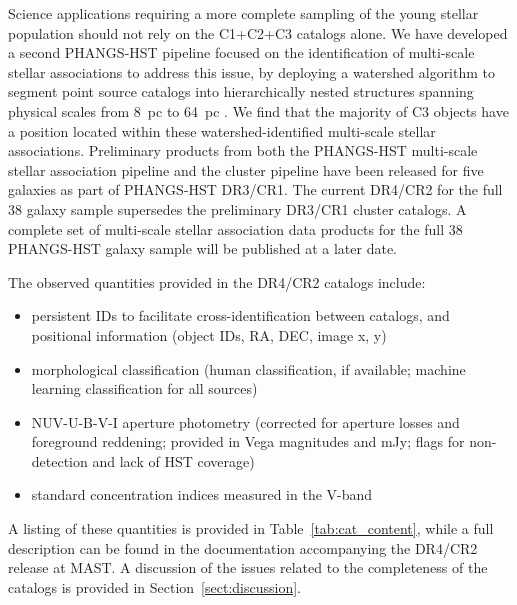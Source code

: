 \documentclass[linenumbers]{aastex63}
\begin{document}
Science applications requiring a more complete sampling of the young stellar population should not rely on the C1+C2+C3 catalogs alone.  We have developed a second PHANGS-HST pipeline focused on the identification of multi-scale stellar associations to address this issue, by deploying a watershed algorithm to segment point source catalogs into hierarchically nested structures spanning physical scales from 8~pc to 64~pc \citep{larson_multiscale_2023}.  We find that the majority of C3 objects have a position located within these watershed-identified multi-scale stellar associations. Preliminary products from both the PHANGS-HST multi-scale stellar association pipeline and the cluster pipeline have been released for five galaxies as part of PHANGS-HST DR3/CR1.  The current DR4/CR2 for the full 38 galaxy sample supersedes the preliminary DR3/CR1 cluster catalogs.  A complete set of multi-scale stellar association data products for the full 38 PHANGS-HST galaxy sample will be published at a later date. %

The observed quantities provided in the DR4/CR2 catalogs include:
\begin{itemize}
\item persistent IDs to facilitate cross-identification between catalogs, and positional information (object IDs, RA, DEC, image x, y)
\item morphological classification (human classification, if available; machine learning classification for all sources)
\item NUV-U-B-V-I aperture photometry (corrected for aperture losses and foreground reddening; provided in Vega magnitudes and mJy; flags for non-detection and lack of HST coverage)
\item standard concentration indices measured in the V-band
\end{itemize}

A listing of these quantities is provided in Table~\ref{tab:cat_content}, while a full description can be found in the documentation accompanying the DR4/CR2 release at MAST. A discussion of the issues related to the completeness of the catalogs is provided in Section~\ref{sect:discussion}.


%

%


\end{document}
